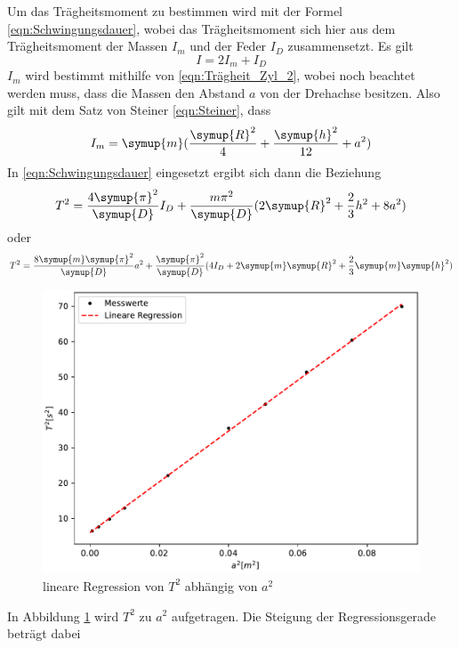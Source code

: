   \noindent Um das Trägheitsmoment zu bestimmen wird mit der Formel \ref{eqn:Schwingungsdauer},
  wobei das Trägheitsmoment sich hier aus dem Trägheitsmoment der Massen $I_m$ und der Feder $I_D$ zusammensetzt. Es gilt
  \begin{equation*}
    I=2I_m+I_D
  \end{equation*}
  $I_m$ wird bestimmt mithilfe von \ref{eqn:Trägheit_Zyl_2}, wobei noch beachtet werden muss, dass die Massen den Abstand $a$ 
  von der Drehachse besitzen. Also gilt mit dem Satz von Steiner \ref{eqn:Steiner}, dass
  \begin{equation*}
    I_m=\symup{m} (\frac{\symup{R}^2}{4}+\frac{\symup{h}^2}{12}+a^2)
  \end{equation*}
  In \ref{eqn:Schwingungsdauer} eingesetzt ergibt sich dann die Beziehung
  \begin{equation*}
    T^2=\frac{4\symup{\pi}^2}{\symup{D}}I_D+\frac{m\pi^2}{\symup{D}} (2\symup{R}^2+\frac{2}{3}h^2+8a^2)
  \end{equation*} 
  oder
  \begin{equation}
    T^2=\frac{8\symup{m}\symup{\pi}^2}{\symup{D}}a^2+\frac{\symup{\pi}^2}{\symup{D}}(4I_D+2\symup{m}\symup{R}^2+\frac{2}{3}\symup{m}\symup{h}^2)
    \label{eqn:Eigenschwing}
  \end{equation} 
    \begin{figure}[H]
    \centering
    \includegraphics[width=\textwidth]{plot.pdf}
    \caption{lineare Regression von $T^2$ abhängig von $a^2$ }
    \label{fig:plot}
  \end{figure}
  \noindent In Abbildung \ref{fig:plot} wird $T^2$ zu $a^2$ aufgetragen. Die Steigung der Regressionsgerade beträgt dabei 

